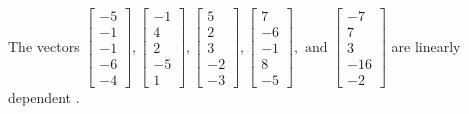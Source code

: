\begin{exercise}
\begin{exerciseStatement}
  \end{exerciseStatement}
  \begin{exerciseAnswer}
   The vectors \(\left[\begin{array}{r}
-5 \\
-1 \\
-1 \\
-6 \\
-4
\end{array}\right] , \left[\begin{array}{r}
-1 \\
4 \\
2 \\
-5 \\
1
\end{array}\right] , \left[\begin{array}{r}
5 \\
2 \\
3 \\
-2 \\
-3
\end{array}\right] , \left[\begin{array}{r}
7 \\
-6 \\
-1 \\
8 \\
-5
\end{array}\right] , \text{ and } \left[\begin{array}{r}
-7 \\
7 \\
3 \\
-16 \\
-2
\end{array}\right]\) are 
  	 linearly dependent  .
  


  \end{exerciseAnswer}
\end{exercise}